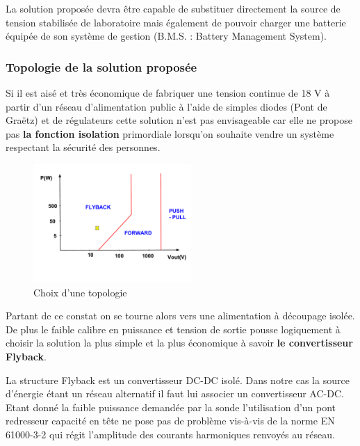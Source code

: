 \documentclass[12pt]{article}
\begin{document}
La solution proposée devra être capable de substituer directement la source de tension stabilisée de laboratoire mais également de pouvoir charger une batterie équipée de son système de gestion (B.M.S. : Battery Management System).
\subsubsection{Topologie de la solution proposée}

Si il est aisé et très économique de fabriquer une tension continue de 18 V à partir d'un réseau d'alimentation public à l'aide de simples diodes (Pont de Graëtz) et de régulateurs cette solution n'est pas envisageable car elle ne propose pas \textbf{la fonction isolation} primordiale lorsqu'on souhaite vendre un système respectant la sécurité des personnes.\par
\vspace{10pt}


\begin{figure}
  \vspace{-50pt}
  \hspace{-0pt}
  \begin{center}
    \includegraphics[width=6cm,trim=0cm 3cm 0cm 0cm, clip=true]{Images_Rapport/choix3}
  \end{center}
  \vspace{-5pt}
  \caption{Choix d'une topologie}
  \vspace{-10pt}
\end{figure}

\vspace{20pt}
Partant de ce constat on se tourne alors vers une alimentation à découpage isolée. De plus le faible calibre en puissance et tension de sortie pousse logiquement à choisir la solution la plus simple et la plus économique à savoir \textbf{le convertisseur Flyback}.\par
\vspace{85pt}
La structure Flyback est un convertisseur DC-DC isolé. Dans notre cas la source d'énergie étant un réseau alternatif il faut lui associer un convertisseur AC-DC. Etant donné la faible puissance demandée par la sonde l'utilisation d'un pont redresseur capacité en tête ne pose pas de problème vis-à-vis de la norme EN 61000-3-2 qui régit l'amplitude des courants harmoniques renvoyés au réseau.\par
\vspace{ 10pt}
\end{document}
